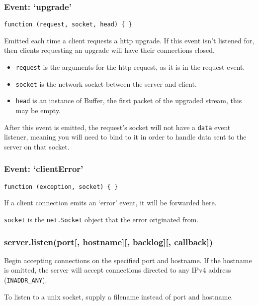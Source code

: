 \subsubsection{\texorpdfstring{Event:
`upgrade'}{Event: upgrade}}\label{event-upgrade}

\texttt{function\ (request,\ socket,\ head)\ \{\ \}}

Emitted each time a client requests a http upgrade. If this event isn't
listened for, then clients requesting an upgrade will have their
connections closed.

\begin{itemize}
\itemsep1pt\parskip0pt
\item
  \texttt{request} is the arguments for the http request, as it is in
  the request event.
\item
  \texttt{socket} is the network socket between the server and client.
\item
  \texttt{head} is an instance of Buffer, the first packet of the
  upgraded stream, this may be empty.
\end{itemize}

After this event is emitted, the request's socket will not have a
\texttt{data} event listener, meaning you will need to bind to it in
order to handle data sent to the server on that socket.

\subsubsection{\texorpdfstring{Event:
`clientError'}{Event: clientError}}\label{event-clienterror}

\texttt{function\ (exception,\ socket)\ \{\ \}}

If a client connection emits an `error' event, it will be forwarded
here.

\texttt{socket} is the \texttt{net.Socket} object that the error
originated from.

\subsubsection{server.listen(port{[}, hostname{]}{[}, backlog{]}{[},
callback{]})}\label{server.listenport-hostname-backlog-callback}

Begin accepting connections on the specified port and hostname. If the
hostname is omitted, the server will accept connections directed to any
IPv4 address (\texttt{INADDR\_ANY}).

To listen to a unix socket, supply a filename instead of port and
hostname.

